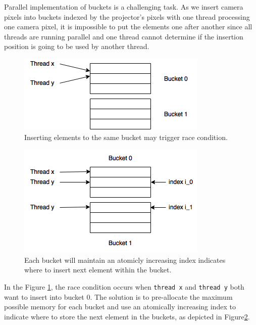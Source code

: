 \documentclass[final,12pt,3p]{elsarticle}
\begin{document}
Parallel implementation of buckets is a challenging task. As we insert camera pixels into buckets indexed by the projector's pixels with one thread processing one camera pixel, it is impossible to put the elements one after another since all threads are running parallel and one thread cannot determine if the insertion position is going to be used by another thread.

\begin{center}
\begin{figure}
    \centering
    \includegraphics{images/race01.png}
    \caption{Inserting elements to the same bucket may trigger race condition.}
    \label{fig:race01}
\end{figure}
\end{center}

\begin{center}
\begin{figure}
    \centering
    \includegraphics{images/race02.png}
    \caption{Each bucket will maintain an atomicly increasing index indicates where to insert next element within the bucket.}
    \label{fig:race02}
\end{figure}
\end{center}

In the Figure \ref{fig:race01}, the race condition occurs when \texttt{thread\ x}
and \texttt{thread\ y} both want to insert into bucket 0. The solution is to pre-allocate the maximum possible memory for each bucket and
use an atomically increasing index to indicate where to store the next element in the buckets, as depicted in Figure\ref{fig:race02}.
\end{document}
